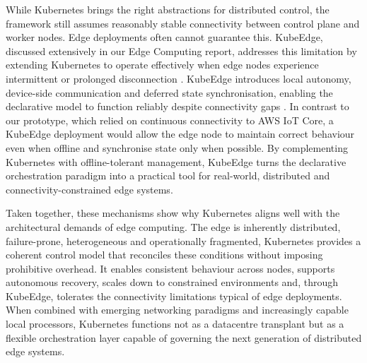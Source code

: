 While Kubernetes brings the right abstractions for distributed control, the framework still assumes reasonably stable connectivity between control plane and worker nodes. Edge deployments often cannot guarantee this. KubeEdge, discussed extensively in our Edge Computing report, addresses this limitation by extending Kubernetes to operate effectively when edge nodes experience intermittent or prolonged disconnection \cite{edge_computing_report}. KubeEdge introduces local autonomy, device-side communication and deferred state synchronisation, enabling the declarative model to function reliably despite connectivity gaps \cite{kubeedge_docs, zhang_kubeedge}. In contrast to our prototype, which relied on continuous connectivity to AWS IoT Core, a KubeEdge deployment would allow the edge node to maintain correct behaviour even when offline and synchronise state only when possible. By complementing Kubernetes with offline-tolerant management, KubeEdge turns the declarative orchestration paradigm into a practical tool for real-world, distributed and connectivity-constrained edge systems.

Taken together, these mechanisms show why Kubernetes aligns well with the architectural demands of edge computing. The edge is inherently distributed, failure-prone, heterogeneous and operationally fragmented, Kubernetes provides a coherent control model that reconciles these conditions without imposing prohibitive overhead. It enables consistent behaviour across nodes, supports autonomous recovery, scales down to constrained environments and, through KubeEdge, tolerates the connectivity limitations typical of edge deployments. When combined with emerging networking paradigms and increasingly capable local processors, Kubernetes functions not as a datacentre transplant but as a flexible orchestration layer capable of governing the next generation of distributed edge systems. \cite{openai_llm_drafting}
